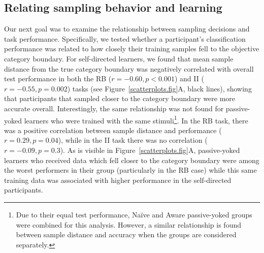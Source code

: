 \documentclass[3p,twocolumn,authoryear,10pt]{elsarticle}
\begin{document}
\subsection{Relating sampling behavior and learning} Our next goal was to examine the relationship between sampling decisions and task performance. Specifically, we tested whether a participant's classification performance was related to how closely their training samples fell to the objective category boundary. For self-directed learners, we found that mean sample distance from the true category boundary was negatively correlated with overall test performance in both the RB ($r=-0.60, p<0.001$) and II ($r=-0.55, p=0.002$) tasks (see Figure~\ref{scatterplots.fig}A, black lines), showing that participants that sampled closer to the category boundary were more accurate overall. Interestingly, the same relationship was not found for passive-yoked learners who were trained with the same stimuli\footnote{Due to their equal test performance, Na\"ive and Aware passive-yoked groups were combined for this analysis. However, a similar relationship is found between sample distance and accuracy when the groups are considered separately.}. In the RB task, there was a positive correlation between sample distance and performance ($r=0.29, p=0.04$), while in the II task there was no correlation ($r=-0.09, p=0.3$). As is visible in Figure~\ref{scatterplots.fig}A, passive-yoked learners who received data which fell closer to the category boundary were among the worst performers in their group (particularly in the RB case) while this same training data was associated with higher performance in the self-directed participants. 

%


\end{document}
